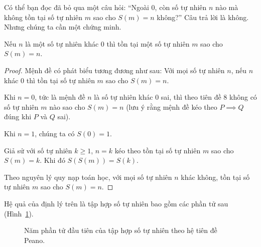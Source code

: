 Có thể bạn đọc đã bỏ qua một câu hỏi: ``Ngoài $0$, còn số tự nhiên $n$ nào mà không tồn tại số tự nhiên $m$ sao cho $S(m) = n$ không?\@'' Câu trả lời là không. Nhưng chúng ta cần một chứng minh.
\begin{theorem}\label{theorem:successor}
    Nếu $n$ là một số tự nhiên khác $0$ thì tồn tại một số tự nhiên $m$ sao cho $S(m) = n$.
\end{theorem}

\begin{proof}
    Mệnh đề có phát biểu tương đương như sau: Với mọi số tự nhiên $n$, nếu $n$ khác $0$ thì tồn tại số tự nhiên $m$ sao cho $S(m) = n$.

    Khi $n = 0$, tức là mệnh đề $n$ là số tự nhiên khác $0$ sai, thì theo tiên đề 8 không có số tự nhiên $m$ nào sao cho $S(m) = n$ (lưu ý rằng mệnh đề kéo theo $P\implies Q$ đúng khi $P$ và $Q$ sai).

    Khi $n = 1$, chúng ta có $S(0) = 1$.

    Giả sử với số tự nhiên $k\geq 1$, $n = k$ kéo theo tồn tại số tự nhiên $m$ sao cho $S(m) = k$. Khi đó $S(S(m)) = S(k)$.

    Theo nguyên lý quy nạp toán học, với mọi số tự nhiên $n$ khác không, tồn tại số tự nhiên $m$ sao cho $S(m) = n$.
\end{proof}

Hệ quả của định lý trên là tập hợp số tự nhiên bao gồm các phần tử sau (Hình~\ref{fig:first-five-natural-numbers}).
\begin{figure}[htp]
    \centering
    \caption{Năm phần tử đầu tiên của tập hợp số tự nhiên theo hệ tiên đề Peano.}\label{fig:first-five-natural-numbers}
\end{figure}

